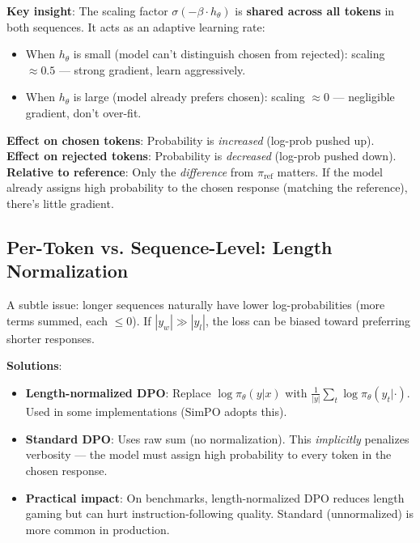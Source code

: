 \textbf{Key insight}: The scaling factor $\sigma(-\beta \cdot h_\theta)$ is \textbf{shared across all tokens} in both sequences. It acts as an adaptive learning rate:

\begin{itemize}
  \item When $h_\theta$ is small (model can’t distinguish chosen from rejected): scaling $\approx 0.5$ --- strong gradient, learn aggressively.
  \item When $h_\theta$ is large (model already prefers chosen): scaling $\approx 0$ --- negligible gradient, don’t over-fit.
\end{itemize}

\textbf{Effect on chosen tokens}: Probability is \emph{increased} (log-prob pushed up).\\

\textbf{Effect on rejected tokens}: Probability is \emph{decreased} (log-prob pushed down).\\

\textbf{Relative to reference}: Only the \emph{difference} from $\pi_{\text{ref}}$ matters. If the model already assigns high probability to the chosen response (matching the reference), there’s little gradient.

\subsection{Per-Token vs. Sequence-Level: Length Normalization}
\label{per-token-vs.-sequence-level-length-normalization}

A subtle issue: longer sequences naturally have lower log-probabilities (more terms summed, each $\leq 0$). If $|y_w| \gg |y_l|$, the loss can be biased toward preferring shorter responses.

\textbf{Solutions}:

\begin{itemize}
  \item \textbf{Length-normalized DPO}: Replace $\log\pi_\theta(y|x)$ with $\frac{1}{|y|}\sum_t \log\pi_\theta(y_t|\cdot)$. Used in some implementations (SimPO adopts this).
  \item \textbf{Standard DPO}: Uses raw sum (no normalization). This \emph{implicitly} penalizes verbosity --- the model must assign high probability to every token in the chosen response.
  \item \textbf{Practical impact}: On benchmarks, length-normalized DPO reduces length gaming but can hurt instruction-following quality. Standard (unnormalized) is more common in production.
\end{itemize}

